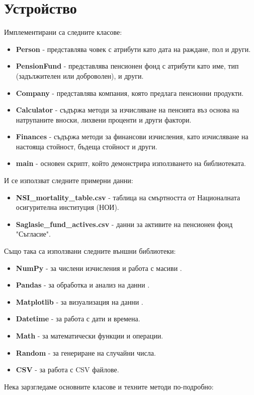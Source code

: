 \documentclass[a4paper,12pt]{article}
\begin{document}
\section{Устройство}
Имплементирани са следните класове:
\begin{itemize}
        \item \textbf{Person} - представлява човек с атрибути като дата на раждане, пол и други.
        \item \textbf{PensionFund} - представлява пенсионен фонд с атрибути като име, тип (задължителен или доброволен), и други.
        \item \textbf{Company} - представлява компания, която предлага пенсионни продукти.
        \item \textbf{Calculator} - съдържа методи за изчисляване на пенсията въз основа на натрупаните вноски, лихвени проценти и други фактори.
        \item \textbf{Finances} - съдържа методи за финансови изчисления, като изчисляване на настояща стойност, бъдеща стойност и други.
        \item \textbf{main} - основен скрипт, който демонстрира използването на библиотеката.
\end{itemize}
И се използват следните примерни данни:
\begin{itemize}
        \item \textbf{NSI\_mortality\_table.csv} - таблица на смъртността от Националната осигурителна институция (НОИ).
        \item \textbf{Saglasie\_fund\_actives.csv} - данни за активите на пенсионен фонд "Съгласие".
\end{itemize}
Също така са използвани следните външни библиотеки:
\begin{itemize}
        \item \textbf{NumPy} - за числени изчисления и работа с масиви \cite{numpy2024}.
        \item \textbf{Pandas} - за обработка и анализ на данни \cite{pandas2024}.
        \item \textbf{Matplotlib} - за визуализация на данни \cite{matplotlib2024}.
        \item \textbf{Datetime} - за работа с дати и времена.
        \item \textbf{Math} - за математически функции и операции.
        \item \textbf{Random} - за генериране на случайни числа.
        \item \textbf{CSV} - за работа с CSV файлове.
\end{itemize}
Нека зарзгледаме основните класове и техните методи по-подробно:
\end{document}

